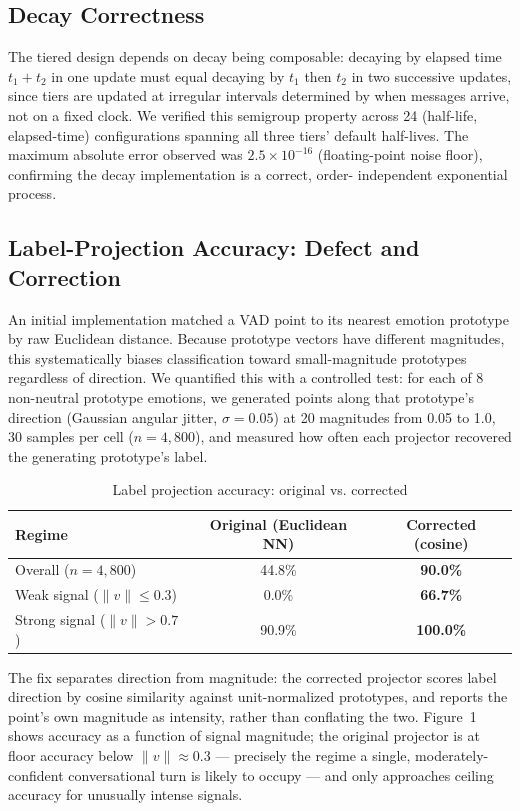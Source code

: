 \documentclass[graybox]{svmult}
\begin{document}
\subsection{Decay Correctness}
The tiered design depends on decay being composable: decaying by elapsed
time $t_1+t_2$ in one update must equal decaying by $t_1$ then $t_2$ in
two successive updates, since tiers are updated at irregular intervals
determined by when messages arrive, not on a fixed clock. We verified
this semigroup property across 24 (half-life, elapsed-time)
configurations spanning all three tiers' default half-lives. The maximum
absolute error observed was $2.5\times10^{-16}$ (floating-point noise
floor), confirming the decay implementation is a correct, order-
independent exponential process.

\subsection{Label-Projection Accuracy: Defect and Correction}
An initial implementation matched a VAD point to its nearest emotion
prototype by raw Euclidean distance. Because prototype vectors have
different magnitudes, this systematically biases classification toward
small-magnitude prototypes regardless of direction. We quantified this
with a controlled test: for each of 8 non-neutral prototype emotions, we
generated points along that prototype's direction (Gaussian angular
jitter, $\sigma=0.05$) at 20 magnitudes from 0.05 to 1.0, 30 samples per
cell ($n=4{,}800$), and measured how often each projector recovered the
generating prototype's label.

\begin{table}[h]
\caption{Label projection accuracy: original vs. corrected}
\centering
\begin{tabular}{lcc}
\toprule
Regime & Original (Euclidean NN) & Corrected (cosine) \\
\midrule
Overall ($n=4{,}800$) & 44.8\% & \textbf{90.0\%} \\
Weak signal ($\|v\|\leq0.3$) & 0.0\% & \textbf{66.7\%} \\
Strong signal ($\|v\|>0.7$) & 90.9\% & \textbf{100.0\%} \\
\bottomrule
\end{tabular}
\end{table}

The fix separates direction from magnitude: the corrected projector
scores label direction by cosine similarity against unit-normalized
prototypes, and reports the point's own magnitude as intensity, rather
than conflating the two. Figure~1 shows accuracy as a function of signal
magnitude; the original projector is at floor accuracy below
$\|v\|\approx0.3$ --- precisely the regime a single, moderately-confident
conversational turn is likely to occupy --- and only approaches ceiling
accuracy for unusually intense signals.
\end{document}
